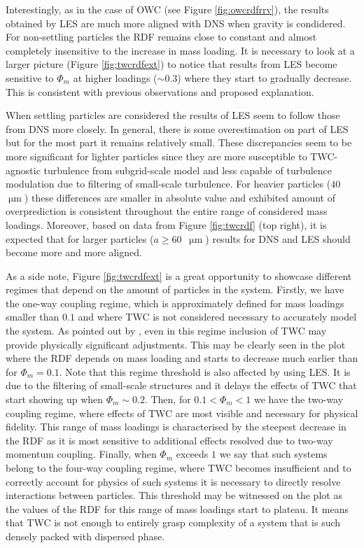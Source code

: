 \documentclass{pracamgren}
\begin{document}
Interestingly, as in the case of OWC (see Figure \ref{fig:owcrdfrrv}), the results obtained by LES are much more aligned with DNS when gravity is condidered.
For non-settling particles the RDF remains close to constant and almost completely insensitive to the increase in mass loading.
It is necessary to look at a larger picture (Figure \ref{fig:twcrdfext}) to notice that results from LES become sensitive to $\Phi_m$ at higher loadings (${\sim 0.3}$) where they start to gradually decrease.
This is consistent with previous observations and proposed explanation.

When settling particles are considered the results of LES seem to follow those from DNS more closely.
In general, there is some overestimation on part of LES but for the most part it remains relatively small.
These discrepancies seem to be more significant for lighter particles since they are more susceptible to TWC-agnostic turbulence from subgrid-scale model and less capable of turbulence modulation due to filtering of small-scale turbulence.
For heavier particles ($40$~$\upmu\text{m}$) these differences are smaller in absolute value and exhibited amount of overprediction is consistent throughout the entire range of considered mass loadings.
Moreover, based on data from Figure \ref{fig:twcrdf} (top right), it is expected that for larger particles (${a \geq 60}$~$\upmu\text{m}$) results for DNS and LES should become more and more aligned.

As a side note, Figure \ref{fig:twcrdfext} is a great opportunity to showcase different regimes that depend on the amount of particles in the system.
Firstly, we have the one-way coupling regime, which is approximately defined for mass loadings smaller than $0.1$ and where TWC is not considered necessary to accurately model the system.
As pointed out by \textcite{Rosa2020}, even in this regime inclusion of TWC may provide physically significant adjustments.
This may be clearly seen in the plot where the RDF depends on mass loading and starts to decrease much earlier than for $\Phi_m=0.1$.
Note that this regime threshold is also affected by using LES.
It is due to the filtering of small-scale structures and it delays the effects of TWC that start showing up when $\Phi_m \sim 0.2$.
Then, for $0.1 < \Phi_m < 1$ we have the two-way coupling regime, where effects of TWC are most visible and necessary for physical fidelity.
This range of mass loadings is characterised by the steepest decrease in the RDF as it is most sensitive to additional effects resolved due to two-way momentum coupling.
Finally, when $\Phi_m$ exceeds $1$ we say that such systems belong to the four-way coupling regime, where TWC becomes insufficient and to correctly account for physics of such systems it is necessary to directly resolve interactions between particles.
This threshold may be witnessed on the plot as the values of the RDF for this range of mass loadings start to plateau.
It means that TWC is not enough to entirely grasp complexity of a system that is such densely packed with dispersed phase.
\end{document}
